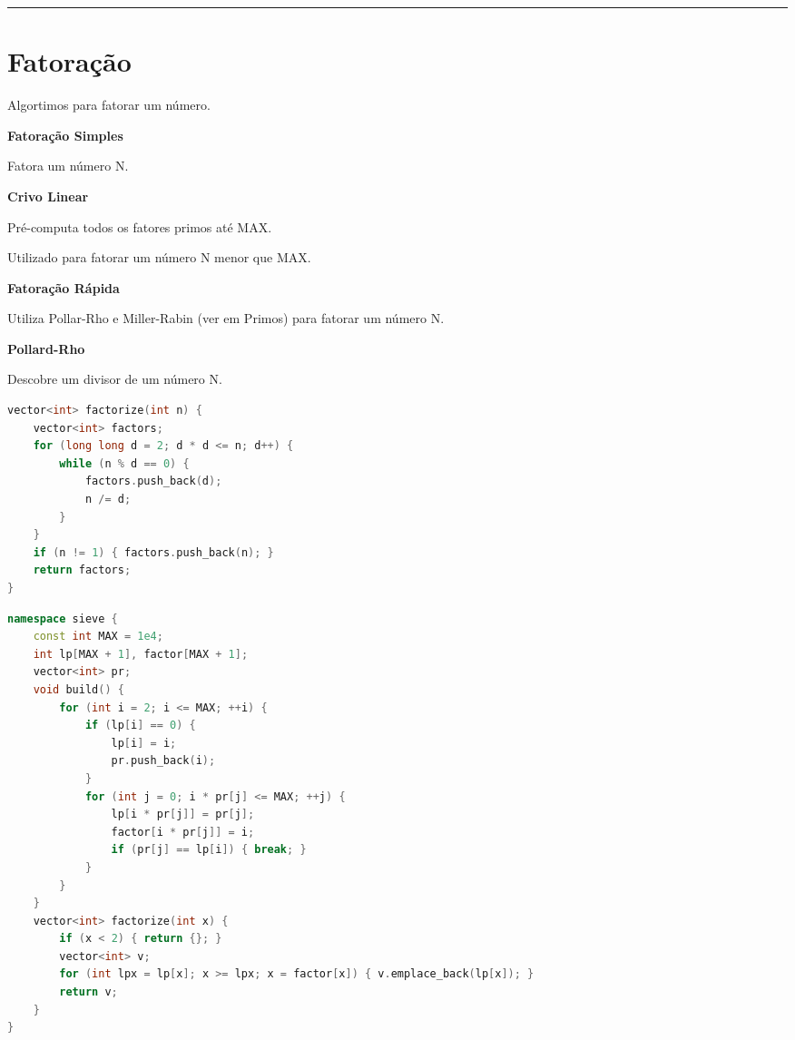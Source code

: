 \documentclass[11pt, a4paper, twoside]{book}
\begin{document}
\hfill

\rule{\textwidth}{0.4pt}

\section{Fatoração}



Algortimos para fatorar um número.



\textbf{Fatoração Simples} 

Fatora um número N.





\textbf{Crivo Linear} 

Pré-computa todos os fatores primos até MAX.

Utilizado para fatorar um número N menor que MAX.





\textbf{Fatoração Rápida} 

Utiliza Pollar-Rho e Miller-Rabin (ver em Primos) para fatorar um número N.





\textbf{Pollard-Rho} 

Descobre um divisor de um número N.




\hfill

\begin{multicols}{2}
\begin{lstlisting}[language=C++]
vector<int> factorize(int n) {
    vector<int> factors;
    for (long long d = 2; d * d <= n; d++) {
        while (n % d == 0) {
            factors.push_back(d);
            n /= d;
        }
    }
    if (n != 1) { factors.push_back(n); }
    return factors;
}
\end{lstlisting}
\end{multicols}

\hfill

\begin{lstlisting}[language=C++]
namespace sieve {
    const int MAX = 1e4;
    int lp[MAX + 1], factor[MAX + 1];
    vector<int> pr;
    void build() {
        for (int i = 2; i <= MAX; ++i) {
            if (lp[i] == 0) {
                lp[i] = i;
                pr.push_back(i);
            }
            for (int j = 0; i * pr[j] <= MAX; ++j) {
                lp[i * pr[j]] = pr[j];
                factor[i * pr[j]] = i;
                if (pr[j] == lp[i]) { break; }
            }
        }
    }
    vector<int> factorize(int x) {
        if (x < 2) { return {}; }
        vector<int> v;
        for (int lpx = lp[x]; x >= lpx; x = factor[x]) { v.emplace_back(lp[x]); }
        return v;
    }
}
\end{lstlisting}
\end{document}
